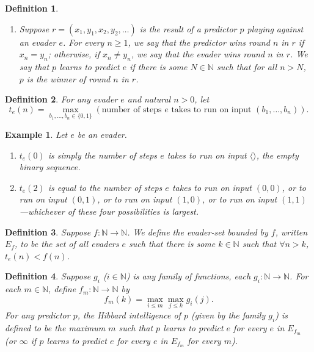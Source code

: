 \documentclass{article}
\newtheorem{definition}{Definition}
\newtheorem{example}[theorem]{Example}
\begin{document}
\begin{definition}
\begin{enumerate}
\begin{enumerate}
            This is thought of as $p$'s $(n+1)$th prediction.
        \end{enumerate}
        \item
        Suppose $r=(x_1,y_1,x_2,y_2,\ldots)$ is the result of a predictor $p$ playing
        against an evader $e$. For every $n\geq 1$,
        we say that \emph{the predictor wins round $n$ in $r$}
        if $x_n=y_n$; otherwise, if $x_n\neq y_n$, we say that
        \emph{the evader wins round $n$ in $r$}.
        We say that \emph{$p$ learns to predict $e$} if there is some $N\in\mathbb N$
        such that for all $n>N$, $p$ is the winner of round $n$ in $r$.
    \end{enumerate}
\end{definition}

\begin{definition}
    For any evader $e$ and natural $n>0$,
    let
    \[
        t_e(n) = \max_{b_1,\ldots,b_n\in \{0,1\}}
        (\text{number of steps $e$ takes to run on input $(b_1,\ldots,b_n)$}).
    \]
\end{definition}

\begin{example}
Let $e$ be an evader.
\begin{enumerate}
    \item
    $t_e(0)$ is simply the number of steps $e$ takes to run on input $\langle\rangle$,
    the empty binary sequence.
    \item
    $t_e(2)$ is equal to the number of steps $e$ takes to run on input
    $(0,0)$, or to run on input $(0,1)$, or to run on input $(1,0)$, or to run on input
    $(1,1)$---whichever of these four possibilities is largest.
\end{enumerate}
\end{example}

\begin{definition}
    Suppose $f:\mathbb N\to\mathbb N$. We define the \emph{evader-set bounded by $f$},
    written $E_f$, to be the set of all evaders $e$ such that
    there is some $k\in\mathbb N$ such that $\forall n>k$,
    $t_e(n)<f(n)$.
\end{definition}

\begin{definition}
\label{generalintelligencemeasuredefn}
    Suppose $g_i$ ($i\in \mathbb N$) is any family of functions,
    each $g_i:\mathbb N\to\mathbb N$.
    For each $m\in\mathbb N$, define $f_m:\mathbb N\to\mathbb N$ by
    \[f_m(k)=\max_{i\leq m}\max_{j\leq k}g_i(j).\]
    For any predictor $p$, the \emph{Hibbard intelligence of $p$ (given by the family $g_i$)}
    is defined to be the maximum $m$ such that
    $p$ learns to predict $e$ for every $e$ in $E_{f_m}$ (or $\infty$
    if $p$ learns to predict $e$ for every $e$ in $E_{f_m}$ for every $m$).
\end{definition}
\end{document}
